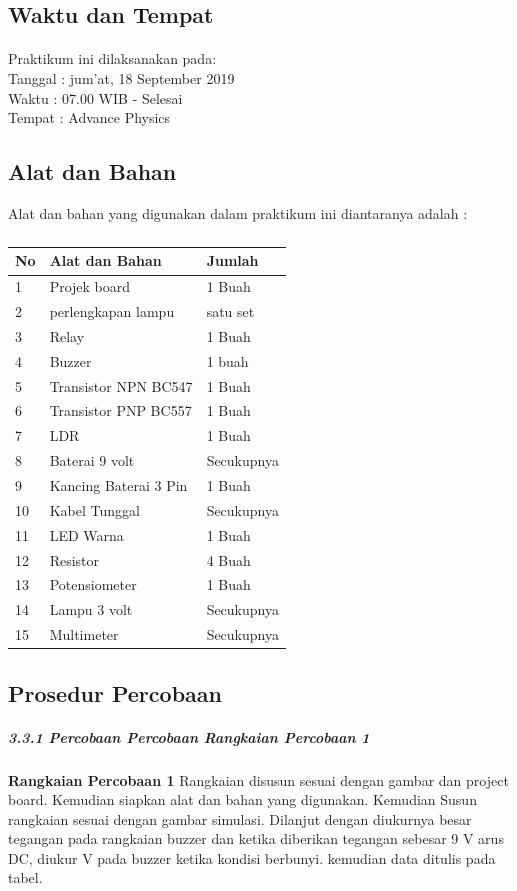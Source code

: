 \documentclass[12pt,a4paper]{article}
\begin{document}
\subsection{Waktu dan Tempat}
\paragraph{ }
Praktikum ini dilaksanakan pada:
\\ 		Tanggal : jum'at, 18 September 2019
\\ 		Waktu : 07.00 WIB - Selesai
\\ 		Tempat : Advance Physics 


\subsection{Alat dan Bahan}
Alat dan bahan yang digunakan dalam praktikum ini diantaranya adalah : 
\subparagraph*{ }
\begin{tabular}{|l|l|l|}  \hline
No & Alat dan Bahan  & Jumlah  \\ \hline
1  & Projek board & 1 Buah \\ \hline
2  & perlengkapan lampu & satu set \\ \hline
3  & Relay & 1 Buah \\ \hline
4  & Buzzer & 1 buah  \\ \hline
5  & Transistor NPN BC547 & 1 Buah \\ \hline
6  & Transistor PNP BC557 & 1 Buah \\ \hline
7  & LDR & 1 Buah \\ \hline
8  & Baterai 9 volt & Secukupnya \\ \hline
9  & Kancing Baterai 3 Pin & 1 Buah \\ \hline
10 & Kabel Tunggal  & Secukupnya \\ \hline
11 & LED Warna & 1 Buah \\ \hline
12 & Resistor  & 4 Buah \\ \hline
13 & Potensiometer & 1 Buah \\ \hline
14 & Lampu 3 volt & Secukupnya \\ \hline
15 & Multimeter & Secukupnya \\ \hline
\end{tabular}

  
    
\subsection{Prosedur Percobaan}
\subparagraph{3.3.1 Percobaan Percobaan Rangkaian Percobaan 1 }
\subparagraph{ }
\textbf{Rangkaian Percobaan 1} Rangkaian disusun sesuai dengan gambar dan project board. Kemudian siapkan alat dan bahan yang digunakan. Kemudian Susun rangkaian sesuai dengan gambar simulasi. Dilanjut dengan diukurnya besar tegangan pada rangkaian buzzer dan ketika diberikan tegangan sebesar 9 V arus DC, diukur  V pada buzzer ketika kondisi berbunyi. kemudian data ditulis pada tabel.
	
\end{document}
